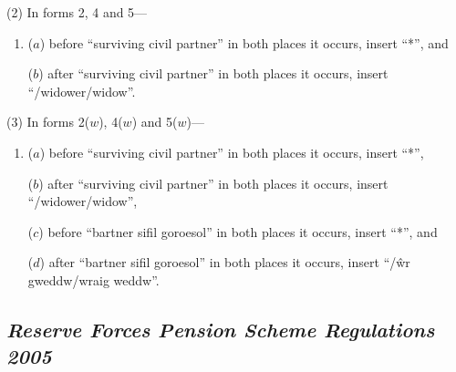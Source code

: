 \documentclass[12pt,a4paper]{article}
\begin{document}
(2) In forms 2, 4 and 5—
\begin{enumerate}\item[]
($a$) before “surviving civil partner” in both places it occurs, insert “*”, and

($b$) after “surviving civil partner” in both places it occurs, insert “/widower/widow”.
\end{enumerate}

(3) In forms 2($w$), 4($w$)  and 5($w$)—
\begin{enumerate}\item[]
($a$) before “surviving civil partner” in both places it occurs, insert “*”,

($b$) after “surviving civil partner” in both places it occurs, insert “/widower/widow”,

($c$) before \foreignlanguage{welsh}{“bartner sifil goroesol”} in both places it occurs, insert “*”, and

($d$) after \foreignlanguage{welsh}{“bartner sifil goroesol”} in both places it occurs, insert \foreignlanguage{welsh}{“/\^wr gweddw/\hspace{0pt}wraig weddw”.}
\end{enumerate}

\subsection*{\itshape Reserve Forces Pension Scheme Regulations 2005}
\end{document}
